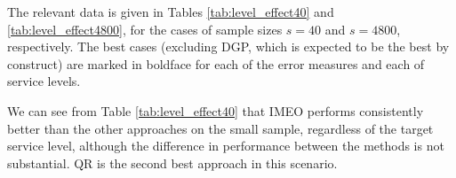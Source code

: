 \documentclass{article}
\begin{document}
The relevant data is given in Tables \ref{tab:level_effect40} and \ref{tab:level_effect4800}, for the cases of sample sizes $s=40$
and $s=4800$, respectively. The best cases (excluding DGP, which is expected to be the best by construct) are marked in boldface for each of the error measures and each of service levels.

\begin{table}[htb]
\caption{Target service level effect with $s=40$}
\label{tab:level_effect40}
\centering
{}
\end{table}

We can see from Table \ref{tab:level_effect40} that IMEO performs consistently better than the other approaches on the small sample, regardless of the target service level, although the difference in performance between the methods is not substantial. QR is the second best approach in this scenario.
\end{document}

